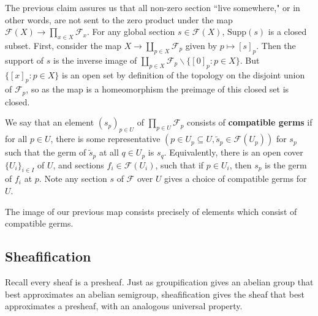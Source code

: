 The previous claim assures us that all non-zero section ``live somewhere," or in other words, are not sent to the zero product under the map $\mathscr{F}(X)\rightarrow \prod_{x \in X}\mathscr{F}_x$. For any global section $s \in \mathscr{F}(X)$, $\text{Supp}(s)$ is a closed subset. First, consider the map $X\rightarrow \amalg_{p \in X}\mathscr{F}_p$ given by $p\mapsto [s]_p$. Then the support of $s$ is the inverse image of $\amalg_{p \in X}\mathscr{F}_p\backslash\{[0]_p:p \in X\}$. But $\{[x]_p:p \in X\}$ is an open set by definition of the topology on the disjoint union of $\mathscr{F}_p$, so as the map is a homeomorphism the preimage of this closed set is closed.

\begin{definition}
    We say that an element $(s_p)_{p \in U}$ of $\prod_{p \in U}\mathscr{F}_p$ consists of \textbf{compatible germs} if for all $p \in U$, there is some representative $(p \in U_p \subseteq U,\tilde{s}_p \in \mathscr{F}(U_p))$ for $s_p$ such that the germ of $\tilde{s}_p$ at all $q \in U_p$ is $s_q$. Equivalently, there is an open cover $\{U_i\}_{i \in I}$ of $U$, and sections $f_i \in \mathscr{F}(U_i)$, such that if $p \in U_i$, then $s_p$ is the germ of $f_i$ at $p$. Note any section $s$ of $\mathscr{F}$ over $U$ gives a choice of compatible germs for $U$.
\end{definition}

The image of our previous map consists precisely of elements which consist of compatible germs. 

\subsection{Sheafification}

Recall every sheaf is a presheaf. Just as groupification gives an abelian group that best approximates an abelian semigroup, sheafification gives the sheaf that best approximates a presheaf, with an analogous universal property.

